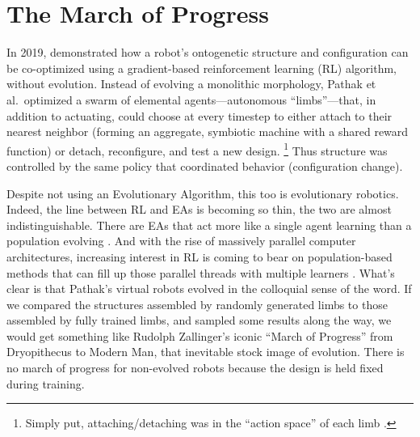\section{The March of Progress}


In 2019, \citet{pathak2019learning} demonstrated how a robot's 
ontogenetic structure and configuration
can be co-optimized using a gradient-based reinforcement learning (RL) algorithm, without evolution.
Instead of evolving a monolithic morphology, Pathak et al.~optimized a swarm of elemental agents---autonomous ``limbs''---that, in addition to actuating, could choose at every timestep to either attach to their nearest neighbor (forming an aggregate, symbiotic machine with a shared reward function) or detach, reconfigure, and test a new design.%
\footnote{%
Simply put,
attaching/detaching was in the ``action space'' of each limb \cite{sutton2018reinforcement}.
}
Thus structure was controlled by the same policy that coordinated 
behavior (configuration change).


Despite not using an Evolutionary Algorithm, this too is evolutionary robotics.
Indeed, the line between RL and EAs 
is becoming so thin, the two are almost indistinguishable.
There are EAs that act more like a single agent learning than a population evolving \cite{salimans2017evolution}.
And with the rise of massively parallel computer architectures,
increasing interest in RL is coming to bear on population-based methods that can fill up those parallel threads with multiple learners  \cite{jaderberg2019human}.
What's clear is that Pathak's virtual robots evolved in the colloquial sense of the word.
If we compared the structures assembled by randomly generated limbs to those assembled by fully trained limbs, and sampled some results along the way, we would get something like Rudolph Zallinger's iconic ``March of Progress'' from Dryopithecus to Modern Man, that inevitable stock image of evolution.
There is no march of progress for non-evolved robots because the design is held fixed during training.



